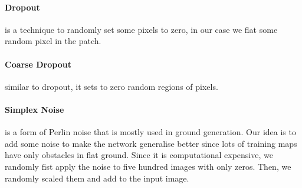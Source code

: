 \documentclass[../document.tex]{subfiles}
\begin{document}
\paragraph{Dropout} is a technique to randomly set some pixels to zero, in our case we flat some random pixel in the patch. 
\paragraph{Coarse Dropout} similar to dropout, it sets to zero random regions of pixels.
\paragraph{Simplex Noise} is a form of Perlin noise that is mostly used in ground generation. Our idea is to add some noise to make the network generalise better since lots of training maps have only obstacles in flat ground. Since it is computational expensive, we randomly fist apply the noise to five hundred images with only zeros. Then, we randomly scaled them and add to the input image.
\end{document}
